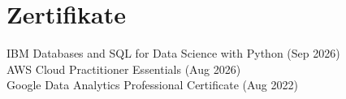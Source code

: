 \section{Zertifikate}
    \begin{itemize}[leftmargin=0in, label={}]
	\small{\item{\strut
		IBM Databases and SQL for Data Science with Python (Sep 2026) \\
		AWS Cloud Practitioner Essentials (Aug 2026) \\
		Google Data Analytics Professional Certificate (Aug 2022)
	}}
    \end{itemize}
